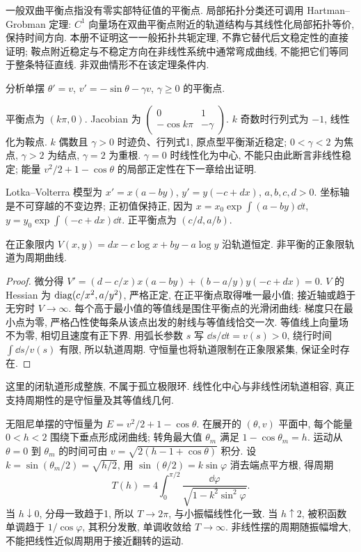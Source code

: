 一般双曲平衡点指没有零实部特征值的平衡点. 局部拓扑分类还可调用 Hartman--Grobman 定理: $C^1$ 向量场在双曲平衡点附近的轨道结构与其线性化局部拓扑等价, 保持时间方向. 本册不证明这一一般拓扑共轭定理, 不靠它替代后文稳定性的直接证明; 鞍点附近稳定与不稳定方向在非线性系统中通常弯成曲线, 不能把它们等同于整条特征直线. 非双曲情形不在该定理条件内.
\begin{example}分析单摆 $\theta'=v$, $v'=-\sin\theta-\gamma v$, $\gamma\ge0$ 的平衡点.\end{example}
\begin{solution}
平衡点为 $(k\pi,0)$. Jacobian 为 $\begin{pmatrix}0&1\\-\cos k\pi&-\gamma\end{pmatrix}$. $k$ 奇数时行列式为 $-1$, 线性化为鞍点. $k$ 偶数且 $\gamma>0$ 时迹负、行列式1, 原点型平衡渐近稳定; $0<\gamma<2$ 为焦点, $\gamma>2$ 为结点, $\gamma=2$ 为重根. $\gamma=0$ 时线性化为中心, 不能只由此断言非线性稳定; 能量 $v^2/2+1-\cos\theta$ 的局部正定性在下一章给出证明.
\end{solution}
Lotka--Volterra 模型为 $x'=x(a-by)$, $y'=y(-c+dx)$, $a,b,c,d>0$. 坐标轴是不可穿越的不变边界; 正初值保持正, 因为 $x=x_0\exp\int(a-by)\dd t$, $y=y_0\exp\int(-c+dx)\dd t$. 正平衡点为 $(c/d,a/b)$.
\begin{proposition}
在正象限内 $V(x,y)=dx-c\log x+by-a\log y$ 沿轨道恒定. 非平衡的正象限轨道为周期曲线.
\end{proposition}
\begin{proof}
微分得
$V'=(d-c/x)x(a-by)+(b-a/y)y(-c+dx)=0$.
$V$ 的 Hessian 为 $\operatorname{diag}(c/x^2,a/y^2)$, 严格正定, 在正平衡点取得唯一最小值; 接近轴或趋于无穷时 $V\to\infty$. 每个高于最小值的等值线是围住平衡点的光滑闭曲线: 梯度只在最小点为零, 严格凸性使每条从该点出发的射线与等值线恰交一次. 等值线上向量场不为零, 相切且速度有正下界. 用弧长参数 $s$ 写 $\dd s/\dd t=v(s)>0$, 绕行时间 $\int\dd s/v(s)$ 有限, 所以轨道周期. 守恒量也将轨道限制在正象限紧集, 保证全时存在.
\end{proof}
这里的闭轨道形成整族, 不属于孤立极限环. 线性化中心与非线性闭轨道相容, 真正支持周期性的是守恒量及其等值线几何.

无阻尼单摆的守恒量为 $E=v^2/2+1-\cos\theta$. 在展开的 $(\theta,v)$ 平面中, 每个能量 $0<h<2$ 围绕下垂点形成闭曲线; 转角最大值 $\theta_m$ 满足 $1-\cos\theta_m=h$. 运动从 $\theta=0$ 到 $\theta_m$ 的时间可由 $v=\sqrt{2(h-1+\cos\theta)}$ 积分. 设 $k=\sin(\theta_m/2)=\sqrt{h/2}$, 用 $\sin(\theta/2)=k\sin\varphi$ 消去端点平方根, 得周期
\[
T(h)=4\int_0^{\pi/2}\frac{\dd\varphi}{\sqrt{1-k^2\sin^2\varphi}}.
\]
当 $h\downarrow0$, 分母一致趋于1, 所以 $T\to2\pi$, 与小振幅线性化一致. 当 $h\uparrow2$, 被积函数单调趋于 $1/\cos\varphi$, 其积分发散, 单调收敛给 $T\to\infty$. 非线性摆的周期随振幅增大, 不能把线性近似周期用于接近翻转的运动.

